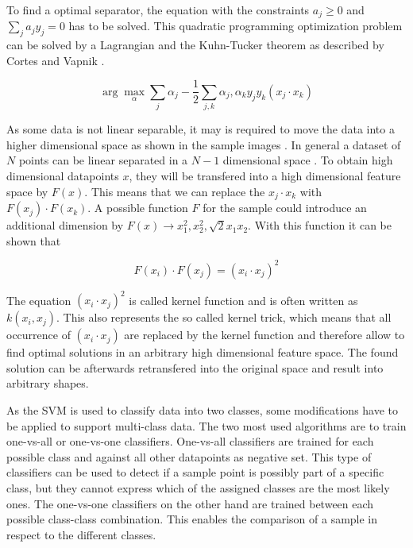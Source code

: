 To find a optimal separator, the equation  with the constraints $a_j \ge 0$ and $\sum_j a_j y_j = 0$ has to be solved. This quadratic programming optimization problem can be solved by a Lagrangian and the Kuhn-Tucker theorem as described by Cortes and Vapnik \cite{cortes1995support}.

\begin{equation}
\arg\max_\alpha \sum_j \alpha_j - \frac{1}{2} \sum_{j,k} \alpha_j, \alpha_k y_j y_k (x_j \cdot x_k)
\label{eqn:svm:maxmarg}
\end{equation}

As some data is not linear separable, it may is required to move the data into a higher dimensional space as shown in the sample images . In general a dataset of $N$ points can be linear separated in a $N-1$ dimensional space \cite{russellnorvig-ai}.
To obtain high dimensional datapoints $x$, they will be transfered into a high dimensional feature space by $F(x)$. This means that we can replace the $x_j \cdot x_k$ with $F(x_j) \cdot F(x_k)$. A possible function $F$ for the sample could introduce an additional dimension by $F(x) \rightarrow x_1^2, x_2^2, \sqrt{2} x_1 x_2$. With this function it can be shown that

\begin{equation}
F(x_i) \cdot F(x_j) = (x_i \cdot x_j)^2
\end{equation}

The equation $(x_i \cdot x_j)^2$ is called kernel function and is often written as $k(x_i, x_j)$. This also represents the so called kernel trick, which means that all occurrence of $(x_i \cdot x_j)$ are replaced by the kernel function and therefore allow to find optimal solutions in an arbitrary high dimensional feature space. The found solution can be afterwards retransfered into the original space and result into arbitrary shapes.

As the \ac{SVM} is used to classify data into two classes, some modifications have to be applied to support multi-class data. The two most used algorithms are to train one-vs-all or one-vs-one classifiers. One-vs-all classifiers are trained for each possible class and against all other datapoints as negative set. This type of classifiers can be used to detect if a sample point is possibly part of a specific class, but they cannot express which of the assigned classes are the most likely ones. The one-vs-one classifiers on the other hand are trained between each possible class-class combination. This enables the comparison of a sample in respect to the different classes.

